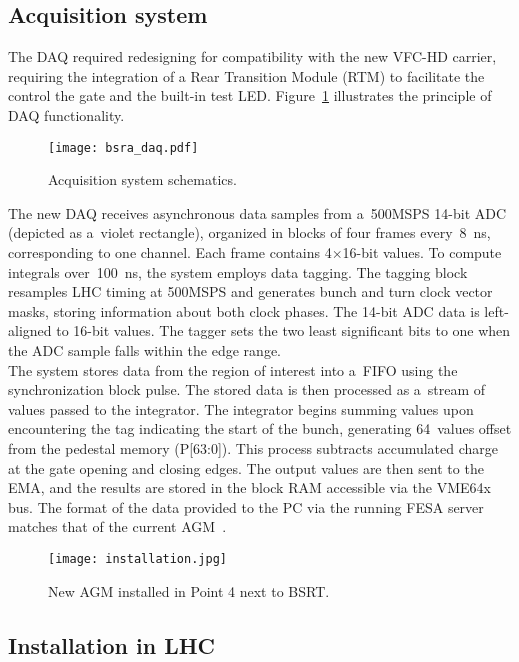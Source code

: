 \subsection{Acquisition system}
The DAQ required redesigning for compatibility with the new VFC-HD carrier,
requiring the integration of a Rear Transition Module (RTM) to facilitate
the control the gate and the built-in test LED. Figure~\ref{fig:bsra_daq}
illustrates the principle of DAQ functionality.
\begin{figure}[!tbh]
    \centering
    \texttt{[image: bsra\_daq.pdf]}
    \caption{Acquisition system schematics.}
    \label{fig:bsra_daq}
\end{figure}
The new DAQ receives asynchronous data samples from a~500MSPS 14-bit ADC
(depicted as a~violet rectangle), organized in blocks of four frames
every~\SI{8}{\nano s}, corresponding to one channel. Each frame contains 4$\times$16-bit values. To compute integrals over~\SI{100}{\nano\second}, the system
employs data tagging. The tagging block resamples LHC timing at 500MSPS and
generates bunch and turn clock vector masks, storing information about both
clock phases. The 14-bit ADC data is left-aligned to 16-bit values. The tagger
sets the two least significant bits to one when the ADC sample falls within the
edge range.\\
The system stores data from the region of interest into a~FIFO using the
synchronization block pulse. The stored data is then processed as a~stream of
values passed to the integrator. The integrator begins summing values upon
encountering the tag indicating the start of the bunch, generating 64~values
offset from the pedestal memory (P[63:0]). This process subtracts accumulated
charge at the gate opening and closing edges. The output values are then
sent to the EMA, and the results are stored in the
block RAM accessible via the VME64x bus. The format of the data provided to the
PC via the running FESA server matches that of the current
AGM~\cite{my_thesis}.

\begin{figure}[!tbh]
    \centering
    \texttt{[image: installation.jpg]}
    \caption{New AGM installed in Point 4 next to BSRT.}
    \label{fig:installation}
\end{figure}

\subsection{Installation in LHC}

